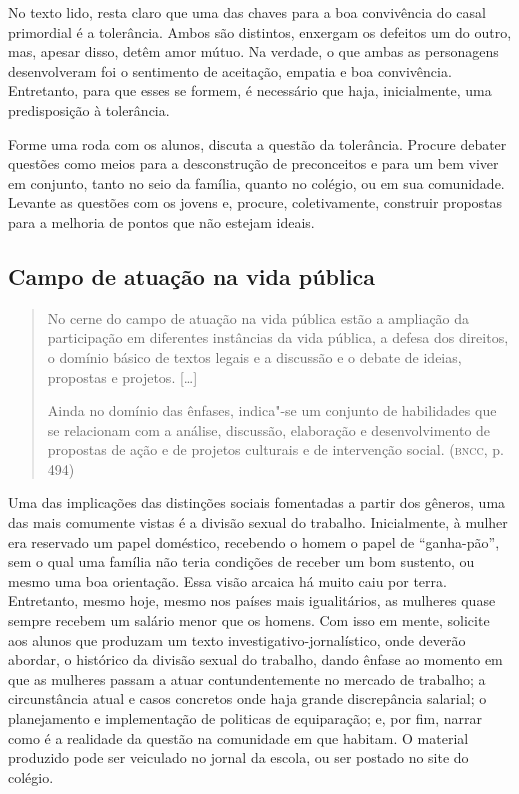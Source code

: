 \documentclass{extarticle}
\begin{document}
No texto lido, resta claro que uma das chaves para a boa convivência
do casal primordial é a tolerância. Ambos são distintos, enxergam os
defeitos um do outro, mas, apesar disso, detêm amor mútuo. Na verdade,
o que ambas as personagens desenvolveram foi o sentimento de
aceitação, empatia e boa convivência. Entretanto, para que esses se
formem, é necessário que haja, inicialmente, uma predisposição à
tolerância.

Forme uma roda com os alunos, discuta a questão da tolerância. Procure
debater questões como meios para a desconstrução de preconceitos e para
um bem viver em conjunto, tanto no seio da família, quanto no colégio,
ou em sua comunidade. Levante as questões com os jovens e, procure,
coletivamente, construir propostas para a melhoria de pontos que não
estejam ideais.

\subsection{Campo de atuação na vida pública}

\begin{quote}
No cerne do campo de atuação na vida pública estão a ampliação da
participação em diferentes instâncias da vida pública, a defesa dos
direitos, o domínio básico de textos legais e a discussão e o debate de
ideias, propostas e projetos. {[}\ldots{}{]}

Ainda no domínio das ênfases, indica"-se um conjunto de habilidades que
se relacionam com a análise, discussão, elaboração e desenvolvimento de
propostas de ação e de projetos culturais e de intervenção social.
(\textsc{bncc}, p. 494)
\end{quote}

Uma das implicações das distinções sociais fomentadas a partir dos
gêneros, uma das mais comumente vistas é a divisão sexual do trabalho.
Inicialmente, à mulher era reservado um papel doméstico, recebendo o
homem o papel de ``ganha-pão'', sem o qual uma família não teria
condições de receber um bom sustento, ou mesmo uma boa orientação.
Essa visão arcaica há muito caiu por terra. Entretanto, mesmo hoje,
mesmo nos países mais igualitários, as mulheres quase sempre recebem
um salário menor que os homens. Com isso em mente, solicite aos alunos
que produzam um texto investigativo-jornalístico, onde deverão
abordar, o histórico da divisão sexual do trabalho, dando ênfase ao
momento em que as mulheres passam a atuar contundentemente no mercado
de trabalho; a circunstância atual e casos concretos onde haja grande
discrepância salarial; o planejamento e implementação de politicas de
equiparação; e, por fim, narrar como é a realidade da questão na
comunidade em que habitam. O material produzido pode ser veiculado no
jornal da escola, ou ser postado no site do colégio.
\end{document}
